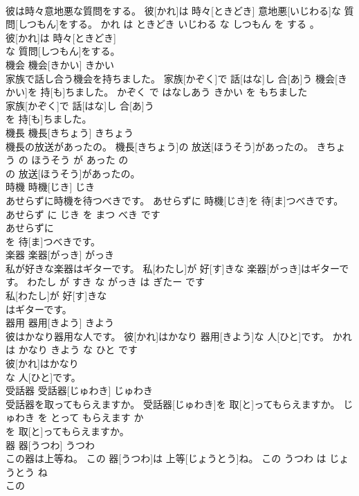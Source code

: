 \documentclass[8pt]{extreport}
\begin{document}
\begin{CJK}{UTF8}{min}
\\	彼は時々意地悪な質問をする。	彼[かれ]は 時々[ときどき] 意地悪[いじわる]な 質問[しつもん]をする。	かれ は ときどき いじわる な しつもん を する 。	
\\	彼[かれ]は 時々[ときどき]
\\	な 質問[しつもん]をする。			
\\	機会	機会[きかい]	きかい	
\\	家族で話し合う機会を持ちました。	家族[かぞく]で 話[はな]し 合[あ]う 機会[きかい]を 持[も]ちました。	かぞく で はなしあう きかい を もちました	
\\	家族[かぞく]で 話[はな]し 合[あ]う
\\	を 持[も]ちました。			
\\	機長	機長[きちょう]	きちょう	
\\	機長の放送があったの。	機長[きちょう]の 放送[ほうそう]があったの。	きちょう の ほうそう が あった の	
\\	の 放送[ほうそう]があったの。			
\\	時機	時機[じき]	じき	
\\	あせらずに時機を待つべきです。	あせらずに 時機[じき]を 待[ま]つべきです。	あせらず に じき を まつ べき です	
\\	あせらずに
\\	を 待[ま]つべきです。			
\\	楽器	楽器[がっき]	がっき	
\\	私が好きな楽器はギターです。	私[わたし]が 好[す]きな 楽器[がっき]はギターです。	わたし が すき な がっき は ぎたー です	
\\	私[わたし]が 好[す]きな
\\	はギターです。			
\\	器用	器用[きよう]	きよう	
\\	彼はかなり器用な人です。	彼[かれ]はかなり 器用[きよう]な 人[ひと]です。	かれ は かなり きよう な ひと です	
\\	彼[かれ]はかなり
\\	な 人[ひと]です。			
\\	受話器	受話器[じゅわき]	じゅわき	
\\	受話器を取ってもらえますか。	受話器[じゅわき]を 取[と]ってもらえますか。	じゅわき を とって もらえます か	
\\	を 取[と]ってもらえますか。			
\\	器	器[うつわ]	うつわ	
\\	この器は上等ね。	この 器[うつわ]は 上等[じょうとう]ね。	この うつわ は じょうとう ね	
\\	この

\end{CJK}
\end{document}

